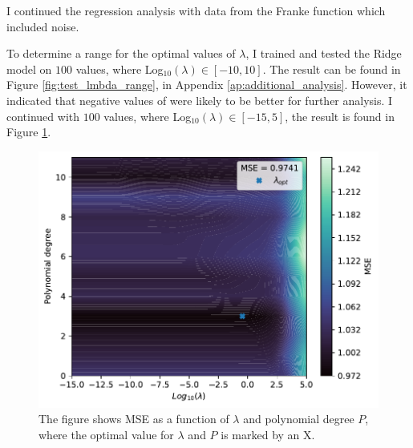 I continued the regression analysis with data from the Franke function which included noise.

To determine a range for the optimal values of $\lambda$, I trained and tested the Ridge model on $100$ values, where Log$_{10}(\lambda) \in [-10, 10]$. The result can be found in Figure \ref{fig:test_lmbda_range}, in Appendix \ref{ap:additional_analysis}. However, it indicated that negative values of were likely to be better for further analysis. I continued with $100$ values, where Log$_{10}(\lambda) \in [-15, 5]$, the result is found in Figure \ref{fig:lmbda_opt}.

\begin{figure}
    \centering
    \includegraphics[width=0.9\linewidth]{project-1/latex/figures/lmbda_opt.pdf}
    \caption{The figure shows MSE as a function of $\lambda$ and polynomial degree $P$, where the optimal value for $\lambda$ and $P$ is marked by an X.}
    \label{fig:lmbda_opt}
\end{figure}





















